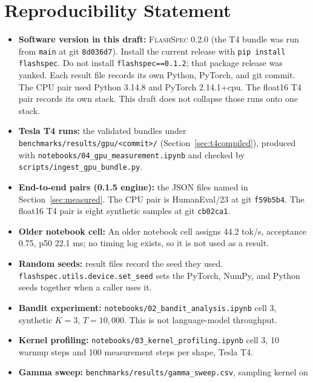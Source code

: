 \documentclass[11pt]{article}
\newcommand{\flashspec}{\textsc{FlashSpec}}
\begin{document}
\section*{Reproducibility Statement}
\label{sec:repro}

\begin{itemize}
  \item \textbf{Software version in this draft:} \flashspec{} 0.2.0
        (the T4 bundle was run from \texttt{main} at git \texttt{8d036d7}).
        Install the current release with \texttt{pip install flashspec}.
        Do not install \texttt{flashspec==0.1.2}; that package release was
        yanked.
        Each result file records its own Python, PyTorch, and git commit.
        The CPU pair used Python 3.14.8 and PyTorch 2.14.1+cpu.
        The float16 T4 pair records its own stack.
        This draft does not collapse those runs onto one stack.
  \item \textbf{Tesla T4 runs:} the validated bundles under
        \texttt{benchmarks/results/gpu/<commit>/} (Section~\ref{sec:t4compiled}),
        produced with \texttt{notebooks/04\_gpu\_measurement.ipynb} and
        checked by \texttt{scripts/ingest\_gpu\_bundle.py}.
  \item \textbf{End-to-end pairs (0.1.5 engine):} the JSON files named in
        Section~\ref{sec:measured}.
        The CPU pair is HumanEval/23 at git \texttt{f59b5b4}.
        The float16 T4 pair is eight synthetic samples at git
        \texttt{cb02ca1}.
  \item \textbf{Older notebook cell:}
        An older notebook cell assigns 44.2 tok/s, acceptance 0.75, p50 22.1 ms; no timing log exists, so it is not used as a result.
  \item \textbf{Random seeds:} result files record the seed they used.
        \texttt{flashspec.utils.device.set\_seed} sets the PyTorch, NumPy,
        and Python seeds together when a caller uses it.
  \item \textbf{Bandit experiment:}
        \texttt{notebooks/02\_bandit\_analysis.ipynb} cell 3, synthetic
        $K{=}3$, $T{=}10{,}000$.
        This is not language-model throughput.
  \item \textbf{Kernel profiling:}
        \texttt{notebooks/03\_kernel\_profiling.ipynb} cell 3, 10 warmup
        steps and 100 measurement steps per shape, Tesla T4.
  \item \textbf{Gamma sweep:}
        \texttt{benchmarks/results/gamma\_sweep.csv}, sampling kernel on

\end{itemize}
\end{document}
